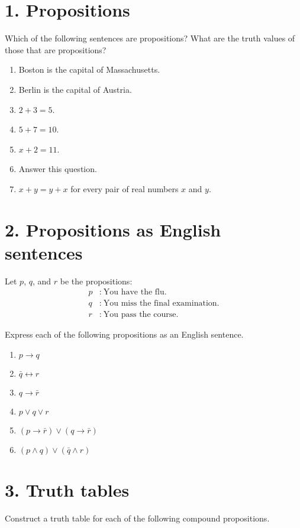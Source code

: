\documentclass[a4paper,10pt]{article}
\begin{document}
\section*{1. Propositions}
Which of the following sentences are propositions? What are the truth values of those that are propositions?

\begin{enumerate}
  \item Boston is the capital of Massachusetts.
  \item Berlin is the capital of Austria.
  \item $2 + 3 = 5$.
  \item $5 + 7 = 10$.
  \item $x + 2 = 11$.
  \item Answer this question.
  \item $x + y = y + x$ for every pair of real numbers $x$ and $y$.
\end{enumerate}

\newpage
\mbox{} 

\newpage
\mbox{}

\section*{2. Propositions as English sentences}
Let $p$, $q$, and $r$ be the propositions:
\[
\begin{aligned}
p&:\ \text{You have the flu.} \\
q&:\ \text{You miss the final examination.} \\
r&:\ \text{You pass the course.}
\end{aligned}
\]

Express each of the following propositions as an English sentence.
\begin{enumerate}
  \item $p \to q$
  \item $\bar{q} \leftrightarrow r$
  \item $q \to \bar{r}$
  \item $p \lor q \lor r$
  \item $(p \to \bar{r}) \lor (q \to \bar{r})$
  \item $(p \land q) \lor (\bar{q} \land r)$
\end{enumerate}

\newpage
\mbox{} 

\newpage
\mbox{}

\section*{3. Truth tables}
Construct a truth table for each of the following compound propositions.
\end{document}
